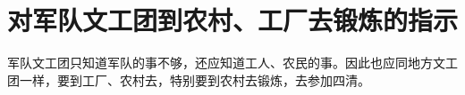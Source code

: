 \section[对军队文工团到农村、工厂去锻炼的指示（一九六五年七月十五日）]{对军队文工团到农村、工厂去锻炼的指示}


军队文工团只知道军队的事不够，还应知道工人、农民的事。因此也应同地方文工团一样，要到工厂、农村去，特别要到农村去锻炼，去参加四清。


